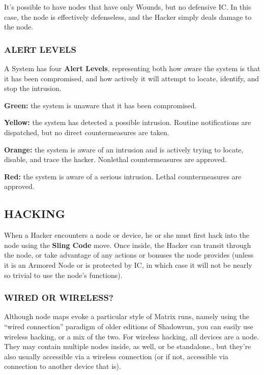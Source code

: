\documentclass[oneside,10pt]{article}
\begin{document}
\begin{multicols}{2}
  It’s possible to have nodes that have only Wounds, but no defensive
  IC. In this case, the node is effectively defenseless, and the
  Hacker simply deals damage to the node.

  \subsubsection{ALERT LEVELS}
  A System has four \textbf{Alert Levels}, representing both how aware
  the system is that it has been compromised, and how actively it will
  attempt to locate, identify, and stop the intrusion.
  \begin{dent}
    \textbf{Green:} the system is unaware that it has been
    compromised.

    \textbf{Yellow:} the system has detected a possible
    intrusion. Routine notifications are dispatched, but no direct
    countermeasures are taken.

    \textbf{Orange:} the system is aware of an intrusion and is
    actively trying to locate, disable, and trace the
    hacker. Nonlethal countermeasures are approved.

    \textbf{Red:} the system is aware of a serious intrusion. Lethal
    countermeasures are approved.
  \end{dent}
  \subsection{HACKING}
  When a Hacker encounters a node or device, he or she must first hack
  into the node using the \textbf{Sling Code} move. Once inside, the
  Hacker can transit through the node, or take advantage of any
  actions or bonuses the node provides (unless it is an Armored Node
  or is protected by IC, in which case it will not be nearly so
  trivial to use the node’s functions).

  \subsubsection{WIRED OR WIRELESS?}
  Although node maps evoke a particular style of Matrix runs, namely
  using the ``wired connection'' paradigm of older editions of
  Shadowrun, you can easily use wireless hacking, or a mix of the
  two. For wireless hacking, all devices are a node. They may contain
  multiple nodes inside, as well, or be standalone., but they’re also
  usually accessible via a wireless connection (or if not, accessible
  via connection to another device that is).


\end{multicols}
\end{document}
